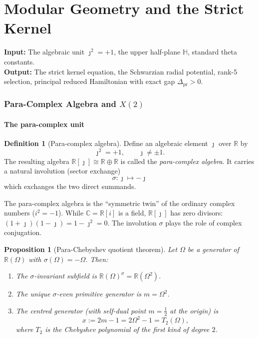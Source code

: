 \documentclass[12pt]{article}
\theoremstyle{plain}
\newtheorem{proposition}[theorem]{Proposition}
\theoremstyle{definition}
\newtheorem{definition}[theorem]{Definition}
\numberwithin{equation}{section}
\newcommand{\R}{\mathbb{R}}
\newcommand{\C}{\mathbb{C}}
\newcommand{\HH}{\mathbb{H}}
\newcommand{\pr}{\mathrm{pr}}
\begin{document}
\newpage



\part{Modular Geometry and the Strict Kernel}

\noindent\textbf{Input:} The algebraic unit $\jmath^2=+1$, the upper half-plane $\HH$, standard theta constants.\\
\textbf{Output:} The strict kernel equation, the Schwarzian radial potential, rank-5 selection, principal reduced Hamiltonian with exact gap $\Delta_{\pr}>0$.

\section{Para-Complex Algebra and $X(2)$}

\subsection{The para-complex unit}

\begin{definition}[Para-complex algebra]
Define an algebraic element $\jmath$ over $\R$ by
\begin{equation}
\jmath^2 = +1, \qquad \jmath \neq \pm 1.
\end{equation}
The resulting algebra $\R[\jmath]\cong\R\oplus\R$ is called the \emph{para-complex algebra}.  It carries a natural involution (sector exchange)
\begin{equation}
\sigma: \jmath \mapsto -\jmath
\end{equation}
which exchanges the two direct summands.
\end{definition}

The para-complex algebra is the ``symmetric twin'' of the ordinary complex numbers ($i^2=-1$).  While $\C=\R[i]$ is a field, $\R[\jmath]$ has zero divisors: $(1+\jmath)(1-\jmath)=1-\jmath^2=0$.  The involution $\sigma$ plays the role of complex conjugation.

\begin{proposition}[Para-Chebyshev quotient theorem]\label{prop:parachebyshev}
Let $\Omega$ be a generator of $\R(\Omega)$ with $\sigma(\Omega)=-\Omega$.  Then:
\begin{enumerate}[label=(\roman*)]
\item The $\sigma$-invariant subfield is $\R(\Omega)^\sigma=\R(\Omega^2)$.
\item The unique $\sigma$-even primitive generator is $m=\Omega^2$.
\item The centred generator (with self-dual point $m=\frac{1}{2}$ at the origin) is
\begin{equation}
\boxed{x := 2m-1 = 2\Omega^2 - 1 = T_2(\Omega),}
\end{equation}
where $T_2$ is the Chebyshev polynomial of the first kind of degree $2$.
\end{enumerate}
\end{proposition}
\end{document}
